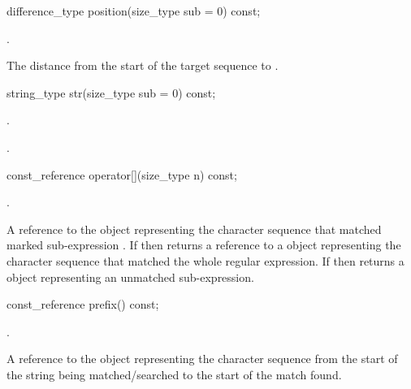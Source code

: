 %
%
\begin{itemdecl}
difference_type position(size_type sub = 0) const;
\end{itemdecl}

\begin{itemdescr}
\pnum
\requires {}.

\pnum
\returns  The distance from the start of the target sequence
to .
\end{itemdescr} 

%
%
\begin{itemdecl}
string_type str(size_type sub = 0) const;
\end{itemdecl}

\begin{itemdescr}
\pnum
\requires {}.

\pnum
\returns  {}.
\end{itemdescr}

%
%
\begin{itemdecl}
const_reference operator[](size_type n) const;
\end{itemdecl}

\begin{itemdescr}
\pnum
\requires {}.

\pnum
\returns  A reference to the  object representing the
character sequence that matched marked sub-expression . If 
then returns a reference to a  object representing the
character sequence that matched the whole regular expression. If
 then returns a  object representing an
unmatched sub-expression.
\end{itemdescr}

%
%
\begin{itemdecl}
const_reference prefix() const;
\end{itemdecl}

\begin{itemdescr}
\pnum
\requires {}.

\pnum
\returns  A reference to the  object representing the
character sequence from the start of the string being
matched/searched to the start of the match found.  
\end{itemdescr}

